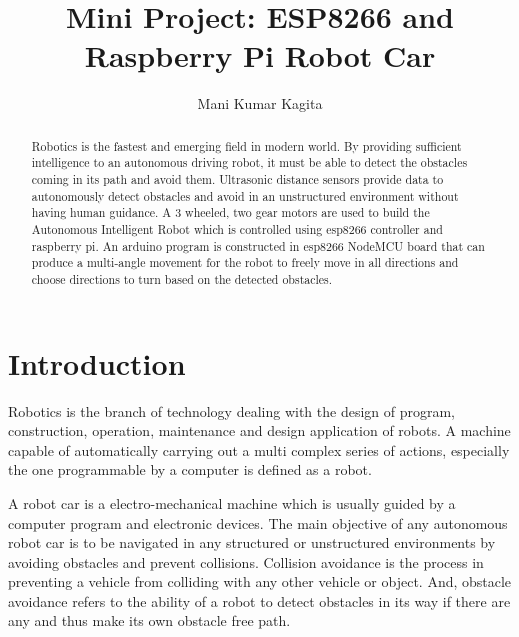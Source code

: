 \documentclass[sigconf]{acmart}
\begin{document}
\title{Mini Project: ESP8266 and Raspberry Pi Robot Car}

\author{Mani Kumar Kagita}


\begin{abstract}
Robotics is the fastest and emerging field in modern world. By providing sufficient 
intelligence to an autonomous driving robot, it must be able to detect the obstacles 
coming in its path and avoid them. Ultrasonic distance sensors provide data to 
autonomously detect obstacles and avoid in an unstructured environment without 
having human guidance. A 3 wheeled, two gear motors are used to build the Autonomous 
Intelligent Robot which is controlled using esp8266 controller and raspberry pi. 
An arduino program is constructed in esp8266 NodeMCU board that can produce a 
multi-angle movement for the robot to freely move in all directions and choose 
directions to turn based on the detected obstacles. 

\end{abstract}


\maketitle

\section{Introduction}
Robotics is the branch of technology dealing with the design of program, construction,
operation, maintenance and design application of robots. A machine capable of 
automatically carrying out a multi complex series of actions, especially the 
one programmable by a computer is defined as a robot. 

A robot car is a electro-mechanical machine which is usually guided by a computer 
program and electronic devices. The main objective of any autonomous robot car is 
to be navigated in any structured or unstructured environments by avoiding obstacles 
and prevent collisions. 
Collision avoidance is the process in preventing a vehicle from colliding with any 
other vehicle or object. And, obstacle avoidance refers to the ability of a robot to 
detect obstacles in its way if there are any and thus make its own obstacle free path.
\end{document}
